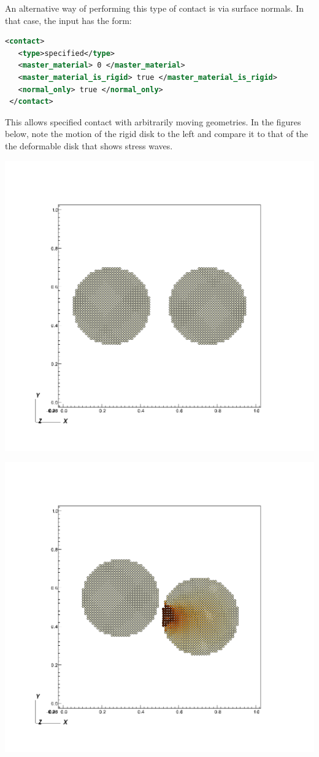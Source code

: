 An alternative way of performing this type of contact is via surface normals.
In that case, the input has the form:
\begin{lstlisting}[language=XML]
 <contact>
   <type>specified</type>
   <master_material> 0 </master_material>
   <master_material_is_rigid> true </master_material_is_rigid>
   <normal_only> true </normal_only>
 </contact>
\end{lstlisting}
This allows specified contact with arbitrarily moving geometries. In the
figures below, note the
motion of the rigid disk to the left and compare it to that of the 
the deformable disk that shows stress waves.

\begin{minipage}[t]{0.3\textwidth}
  \centering
  \includegraphics[width=0.9\columnwidth]{FIGS/contact/specified0.png}
\end{minipage}
\begin{minipage}[t]{0.3\textwidth}
  \centering
  \includegraphics[width=0.9\columnwidth]{FIGS/contact/specified1.png}
\end{minipage}
